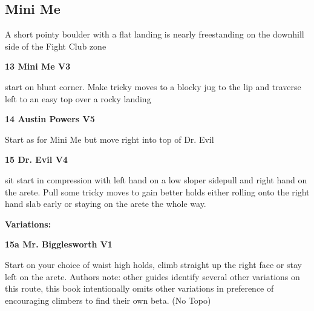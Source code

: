 \begin{multicols}{2}
		\needspace{1.5cm}
		\subsection*{Mini Me}\label{bf:Mini Me}
		A short pointy boulder with a flat landing is nearly freestanding on the downhill side of the Fight Club zone\\
	
		
			
			\needspace{1.5cm}
\label{rt:Mini Me}
\colorbox{green!20}{
\parbox{0.95\linewidth}{
\textbf{
13 Mini Me V3  
}}}

			\begin{adjustwidth}{0.5cm}{}			
			start on blunt corner. Make tricky moves to a blocky jug to the lip and traverse left to an easy top over a rocky landing
			\end{adjustwidth}
			
			
			
			\needspace{1.5cm}
\label{rt:Austin Powers}
\colorbox{RoyalBlue!20}{
\parbox{0.95\linewidth}{
\textbf{
14 Austin Powers V5  
}}}

			\begin{adjustwidth}{0.5cm}{}			
			Start as for Mini Me but move right into top of Dr. Evil
			\end{adjustwidth}
			
			
			
			\needspace{1.5cm}
\label{rt:Dr. Evil}
\colorbox{RoyalBlue!20}{
\parbox{0.95\linewidth}{
\textbf{
15 Dr. Evil V4  
}}}

			\begin{adjustwidth}{0.5cm}{}			
			sit start in compression with left hand on a low sloper sidepull and right hand on the arete. Pull some tricky moves to gain better holds either rolling onto the right hand slab early or staying on the arete the whole way.
			\end{adjustwidth}
			
				\begin{adjustwidth}{0.5cm}{}				
				\needspace{3cm}
				\textbf{Variations:} \newline
					
					\needspace{1.5cm}
\label{vr:Mr. Bigglesworth}
\colorbox{green!20}{
\parbox{0.95\linewidth}{
\textbf{
15a Mr. Bigglesworth V1  
}}}

					\begin{adjustwidth}{0.5cm}{}			
					Start on your choice of waist high holds, climb straight up the right face or stay left on the arete. Authors note: other guides identify several other variations on this route, this book intentionally omits other variations in preference of encouraging climbers to find their own beta. (No Topo)
					\end{adjustwidth}
					

\end{adjustwidth}
\end{multicols}
